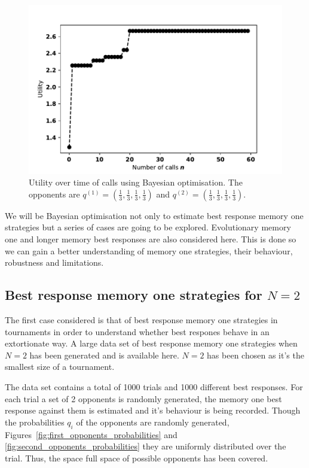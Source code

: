 \documentclass[10pt]{article}
\begin{document}
\begin{figure}[!htbp]
    \begin{center}
    \includegraphics[width=.5\linewidth]{img/bayesian_example.pdf}
    \end{center}
    \caption{Utility over time of calls using Bayesian optimisation. The
    opponents are \(q^{(1)} = (\frac{1}{3}, \frac{1}{3}, \frac{1}{3},
    \frac{1}{3})\) and \(q^{(2)} = (\frac{1}{3}, \frac{1}{3},
    \frac{1}{3}, \frac{1}{3})\).}
    \label{bayesian_example}
\end{figure}

We will be Bayesian optimisation not only to estimate best response memory one
strategies but a series of cases are going to be explored. Evolutionary memory
one and longer memory best responses are also considered here. This is done so
we can gain a better understanding of memory one strategies, their behaviour,
robustness and limitations.

\subsection{Best response memory one strategies for \(N=2\)}\label{subsection:best_response_n_2}

The first case considered is that of best response memory one strategies in tournaments
in order to understand whether best respones behave in an extortionate way. A
large data set of best response memory one strategies when \(N=2\) has been
generated and is available here. \(N=2\) has been chosen as it's
the smallest size of a tournament.

The data set contains a total of 1000 trials and 1000 different best responses.
For each trial a set of 2 opponents is randomly generated, the memory one best
response against them is estimated and it's behaviour is being recorded.
Though the probabilities \(q_i\) of the opponents are randomly generated,
Figures~\ref{fig:first_opponents_probabilities} and \ref{fig:second_opponents_probabilities}
they are uniformly distributed over the trial. Thus, the space full space of
possible opponents has been covered.
\end{document}
